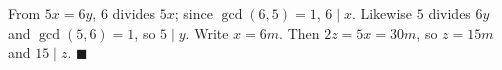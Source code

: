 From $5x=6y$, $6$ divides $5x$; since $\gcd(6,5)=1$, $6\mid x$. Likewise $5$ divides $6y$ and $\gcd(5,6)=1$, so $5\mid y$. Write $x=6m$. Then $2z=5x=30m$, so $z=15m$ and $15\mid z$. $\blacksquare$
